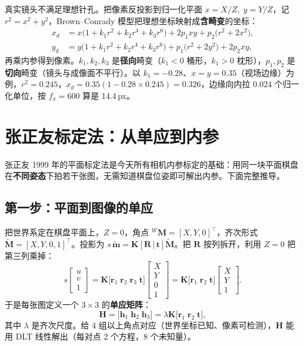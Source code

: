 真实镜头不满足理想针孔。把像素反投影到归一化平面 $x=X/Z,\;y=Y/Z$，记 $r^2=x^2+y^2$，Brown--Conrady 模型把理想坐标映射成\textbf{含畸变}的坐标：
\begin{equation}
\begin{aligned}
x_d &= x\bigl(1+k_1r^2+k_2r^4+k_3r^6\bigr)+2p_1xy+p_2\bigl(r^2+2x^2\bigr),\\
y_d &= y\bigl(1+k_1r^2+k_2r^4+k_3r^6\bigr)+p_1\bigl(r^2+2y^2\bigr)+2p_2xy,
\end{aligned}
\label{eq:26-distort}
\end{equation}
再乘内参得到像素。$k_1,k_2,k_3$ 是\textbf{径向}畸变（$k_1<0$ 桶形，$k_1>0$ 枕形），$p_1,p_2$ 是\textbf{切向}畸变（镜头与成像面不平行）。以 $k_1=-0.28$、$x=y=0.35$（视场边缘）为例，$r^2=0.245$，$x_d=0.35(1-0.28\times0.245)=0.326$，边缘向内拉 0.024 个归一化单位，按 $f_x=600$ 算是 14.4\,px。

\section{张正友标定法：从单应到内参}\label{sec:26-zhang}

张正友 1999 年的平面标定法是今天所有相机内参标定的基础：用同一块平面棋盘在\textbf{不同姿态}下拍若干张图，无需知道棋盘位姿即可解出内参。下面完整推导。

\subsection{第一步：平面到图像的单应}

把世界系定在棋盘平面上，$Z=0$，角点 ${}^{W}\bm{M}=[X,Y,0]^{\top}$，齐次形式 $\tilde{\bm{M}}=[X,Y,0,1]^{\top}$。投影为 $s\,\tilde{\bm{m}}=\bm{K}[\bm{R}\,|\,\bm{t}]\tilde{\bm{M}}$。把 $\bm{R}$ 按列拆开，利用 $Z=0$ 把第三列乘掉：
\begin{equation}
s\begin{bmatrix}u\\v\\1\end{bmatrix}
=\bm{K}\bigl[\bm{r}_1\;\bm{r}_2\;\bm{r}_3\;\bm{t}\bigr]
\begin{bmatrix}X\\Y\\0\\1\end{bmatrix}
=\bm{K}\bigl[\bm{r}_1\;\bm{r}_2\;\bm{t}\bigr]
\begin{bmatrix}X\\Y\\1\end{bmatrix}.
\label{eq:26-planehom}
\end{equation}
于是每张图定义一个 $3\times3$ 的\textbf{单应矩阵}：
\begin{equation}
\bm{H}=\bigl[\bm{h}_1\;\bm{h}_2\;\bm{h}_3\bigr]=\lambda\bm{K}\bigl[\bm{r}_1\;\bm{r}_2\;\bm{t}\bigr],
\label{eq:26-homography}
\end{equation}
其中 $\lambda$ 是齐次尺度。给 4 组以上角点对应（世界坐标已知、像素可检测），$\bm{H}$ 能用 DLT 线性解出（每对点 2 个方程，8 个未知量）。

